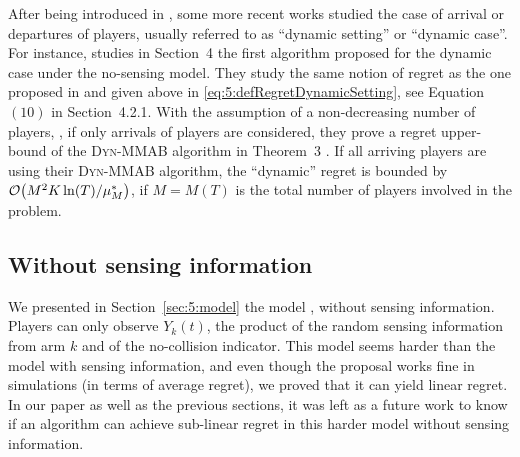 After being introduced in \cite{Rosenski16}, some more recent works studied the case of arrival or departures of players, usually referred to as ``dynamic setting'' or ``dynamic case''.
For instance, \cite{BoursierPerchet18} studies in Section~4 the first algorithm proposed for the dynamic case under the no-sensing model.
They study the same notion of regret as the one proposed in \cite{Rosenski16} and given above in \eqref{eq:5:defRegretDynamicSetting}, see Equation $(10)$ in Section~4.2.1.
With the assumption of a non-decreasing number of players, \ie, if only arrivals of players are considered,
they prove a regret upper-bound of the \textsc{Dyn-MMAB} algorithm in Theorem~3 .
If all arriving players are using their \textsc{Dyn-MMAB} algorithm, the ``dynamic'' regret is bounded by $\mathop{}\mathopen{}\mathcal{O}\mathopen{}\left(M^2 K \ln(T) / \mu^*_{M}\right)$, if $M=M(T)$ is the total number of players involved in the problem.






\subsection{Without sensing information}
\label{sub:5:withoutSensing}

We presented in Section~\ref{sec:5:model} the model \modeltrois, without sensing information. Players can only observe $Y_k(t)$, the product of the \iid{} random sensing information from arm $k$ and of the no-collision indicator.
This model seems harder than the model with sensing information, and even though the proposal \Selfish{} works fine in simulations (in terms of average regret), we proved that it can yield linear regret.
In our paper \cite{Besson2018ALT} as well as the previous sections, it was left as a future work to know if an algorithm can achieve sub-linear regret in this harder model without sensing information.

